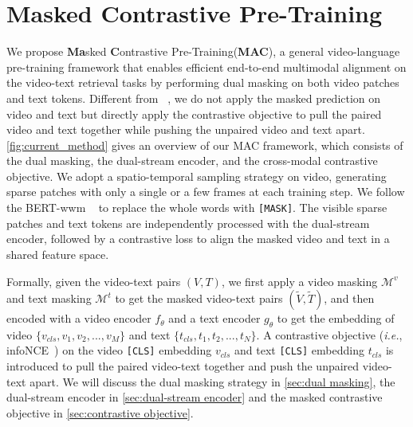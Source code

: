 \documentclass[10pt,twocolumn,letterpaper]{article}
\begin{document}
\vspace{-1mm}\section{Masked Contrastive Pre-Training}
\label{sec:method}
We propose \textbf{Ma}sked \textbf{C}ontrastive Pre-Training(\textbf{MAC}), a general video-language pre-training framework that enables efficient end-to-end multimodal alignment on the video-text retrieval tasks by performing dual masking on both video patches and text tokens. Different from ~\cite{mae, beit, videomae, st_mae}, we do not apply the masked prediction on video and text but directly apply the contrastive objective to pull the paired video and text together while pushing the unpaired video and text apart. \cref{fig:current_method} gives an overview of our MAC framework, which consists of the dual masking, the dual-stream encoder, and the cross-modal contrastive objective. We adopt a spatio-temporal sampling strategy on video, generating sparse patches with only a single or a few frames at each training step. We follow the BERT-wwm ~\cite{bert-www} to replace the whole words with \verb+[MASK]+. The visible sparse patches and text tokens are independently processed with the dual-stream encoder, followed by a contrastive loss to align the masked video and text in a shared feature space.

Formally, given the video-text pairs $(V, T)$, we first apply a video masking $\mathcal{M}^v$ and text masking $\mathcal{M}^t$ to get the masked video-text pairs $(\tilde{V}, \tilde{T})$, and then encoded with a video encoder $f_\theta$ and a text encoder $g_\theta$ to get the embedding of video $\{v_{cls},v_1,v_2,...,v_M \}$ and text $\{t_{cls},t_1,t_2,...,t_N \}$. A contrastive objective (\emph{i.e.}, infoNCE~\cite{cpc_infonce}) on the video \verb+[CLS]+ embedding $v_{cls}$ and text \verb+[CLS]+ embedding $t_{cls}$ is introduced to pull the paired video-text together and push the unpaired video-text apart. We will discuss the dual masking strategy in \cref{sec:dual masking}, the dual-stream encoder in \cref{sec:dual-stream encoder} and the masked contrastive objective in \cref{sec:contrastive objective}.
\end{document}
